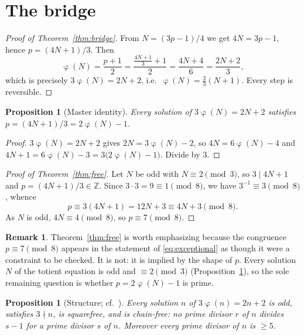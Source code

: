 \documentclass[11pt,reqno]{amsart}
\theoremstyle{plain}
\newtheorem{proposition}[theorem]{Proposition}
\theoremstyle{definition}
\newtheorem{remark}[theorem]{Remark}
\newcommand{\Z}{\mathbb{Z}}
\DeclareMathOperator{\tot}{\varphi}
\begin{document}
\section{The bridge}\label{sec:bridge}

\begin{proof}[Proof of Theorem~\ref{thm:bridge}]
From $N=(3p-1)/4$ we get $4N=3p-1$, hence $p=(4N+1)/3$. Then
\[
  \tot(N)=\frac{p+1}{2}
  =\frac{\frac{4N+1}{3}+1}{2}
  =\frac{4N+4}{6}
  =\frac{2N+2}{3},
\]
which is precisely $3\tot(N)=2N+2$, i.e.\ $\tot(N)=\tfrac23(N+1)$. Every step is reversible.
\end{proof}

\begin{proposition}[Master identity]\label{prop:master}
Every solution of $3\tot(N)=2N+2$ satisfies $p=(4N+1)/3=2\tot(N)-1$.
\end{proposition}

\begin{proof}
$3\tot(N)=2N+2$ gives $2N=3\tot(N)-2$, so $4N=6\tot(N)-4$ and
$4N+1=6\tot(N)-3=3\big(2\tot(N)-1\big)$. Divide by $3$.
\end{proof}

\begin{proof}[Proof of Theorem~\ref{thm:free}]
Let $N$ be odd with $N\equiv2\pmod 3$, so $3\mid 4N+1$ and $p=(4N+1)/3\in\Z$. Since
$3\cdot3=9\equiv1\pmod 8$, we have $3^{-1}\equiv3\pmod8$, whence
\[
  p\equiv 3(4N+1)=12N+3\equiv 4N+3 \pmod 8 .
\]
As $N$ is odd, $4N\equiv4\pmod 8$, so $p\equiv 7\pmod 8$.
\end{proof}

\begin{remark}
Theorem~\ref{thm:free} is worth emphasizing because the congruence $p\equiv7\pmod8$ appears in
the statement of \eqref{eq:exceptional} as though it were a constraint to be checked. It is
not: it is implied by the shape of $p$. Every solution $N$ of the totient equation is odd and
$\equiv2\pmod3$ (Proposition~\ref{prop:struct}), so the sole remaining question is whether
$p=2\tot(N)-1$ is prime.
\end{remark}

\begin{proposition}[Structure; cf.\ \cite{Herch}]\label{prop:struct}
Every solution $n$ of $3\tot(n)=2n+2$ is odd, satisfies $3\nmid n$, is squarefree, and is
\emph{chain-free}: no prime divisor $r$ of $n$ divides $s-1$ for a prime divisor $s$ of $n$.
Moreover every prime divisor of $n$ is $\ge5$.
\end{proposition}
\end{document}
